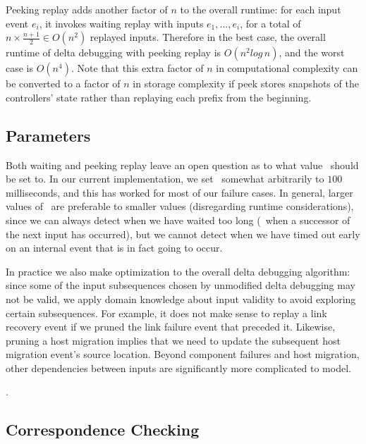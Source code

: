 Peeking replay adds another factor of $n$ to the overall runtime: for each input event
$e_i$, it invokes waiting replay with inputs $e_1,\dots,e_i$, for a total of
$n \times \frac{n+1}{2} \in O(n^2)$ replayed inputs. Therefore in the
best case, the overall runtime of delta debugging with peeking replay is
$O(n^2log\,n)$, and the worst case is $O(n^4)$. Note that this extra factor of
$n$ in computational complexity can be converted to a factor of $n$ in storage
complexity if peek stores snapshots of
the controllers' state rather than replaying each prefix from the beginning.

\subsection{Parameters}
\label{subsec:params}

Both waiting and peeking replay leave an open question as to what value
\textepsilon~should be set to. In our current implementation,
we set \textepsilon~\num{somewhat arbitrarily} to $100$ milliseconds, and this has worked for \num{most} of our
failure cases. In general, larger values of \textepsilon~are preferable to
smaller values (disregarding runtime considerations), since we can always
detect when we have waited too long (\viz~when a successor of the next input
has occurred), but we cannot detect when we have timed out
early on an internal event that is in fact going to occur.

In practice we also make optimization to the overall delta debugging
algorithm: since some of the input subsequences
chosen by unmodified delta debugging may not be valid, we apply domain knowledge
about input validity to avoid exploring certain subsequences. For example, it does
not make sense to replay a link recovery event if we pruned
the link failure event that preceded it. Likewise, pruning a host migration
implies that we need to update the subsequent host migration event's source location.
Beyond component failures and host migration, other dependencies between
inputs are significantly more complicated to model.

 .

\subsection{Correspondence Checking}
\label{subsec:cc}

